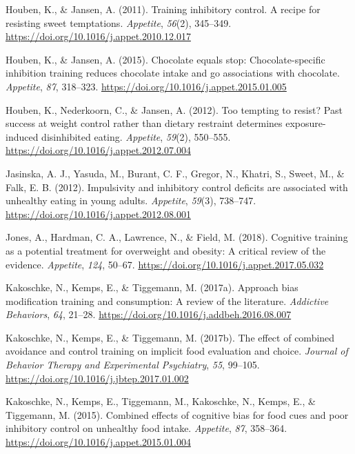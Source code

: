 \documentclass[man]{apa6}
\begin{document}
\leavevmode\hypertarget{ref-houben_training_2011}{}%
Houben, K., \& Jansen, A. (2011). Training inhibitory control. A recipe for resisting sweet temptations. \emph{Appetite}, \emph{56}(2), 345--349. \url{https://doi.org/10.1016/j.appet.2010.12.017}

\leavevmode\hypertarget{ref-houben_chocolate_2015}{}%
Houben, K., \& Jansen, A. (2015). Chocolate equals stop: Chocolate-specific inhibition training reduces chocolate intake and go associations with chocolate. \emph{Appetite}, \emph{87}, 318--323. \url{https://doi.org/10.1016/j.appet.2015.01.005}

\leavevmode\hypertarget{ref-houben_too_2012}{}%
Houben, K., Nederkoorn, C., \& Jansen, A. (2012). Too tempting to resist? Past success at weight control rather than dietary restraint determines exposure-induced disinhibited eating. \emph{Appetite}, \emph{59}(2), 550--555. \url{https://doi.org/10.1016/j.appet.2012.07.004}

\leavevmode\hypertarget{ref-jasinska_impulsivity_2012}{}%
Jasinska, A. J., Yasuda, M., Burant, C. F., Gregor, N., Khatri, S., Sweet, M., \& Falk, E. B. (2012). Impulsivity and inhibitory control deficits are associated with unhealthy eating in young adults. \emph{Appetite}, \emph{59}(3), 738--747. \url{https://doi.org/10.1016/j.appet.2012.08.001}

\leavevmode\hypertarget{ref-jonesCognitiveTrainingPotential2018}{}%
Jones, A., Hardman, C. A., Lawrence, N., \& Field, M. (2018). Cognitive training as a potential treatment for overweight and obesity: A critical review of the evidence. \emph{Appetite}, \emph{124}, 50--67. \url{https://doi.org/10.1016/j.appet.2017.05.032}

\leavevmode\hypertarget{ref-kakoschke_approach_2017}{}%
Kakoschke, N., Kemps, E., \& Tiggemann, M. (2017a). Approach bias modification training and consumption: A review of the literature. \emph{Addictive Behaviors}, \emph{64}, 21--28. \url{https://doi.org/10.1016/j.addbeh.2016.08.007}

\leavevmode\hypertarget{ref-kakoschke_effect_2017}{}%
Kakoschke, N., Kemps, E., \& Tiggemann, M. (2017b). The effect of combined avoidance and control training on implicit food evaluation and choice. \emph{Journal of Behavior Therapy and Experimental Psychiatry}, \emph{55}, 99--105. \url{https://doi.org/10.1016/j.jbtep.2017.01.002}

\leavevmode\hypertarget{ref-kakoschke_combined_2015}{}%
Kakoschke, N., Kemps, E., Tiggemann, M., Kakoschke, N., Kemps, E., \& Tiggemann, M. (2015). Combined effects of cognitive bias for food cues and poor inhibitory control on unhealthy food intake. \emph{Appetite}, \emph{87}, 358--364. \url{https://doi.org/10.1016/j.appet.2015.01.004}
\end{document}

